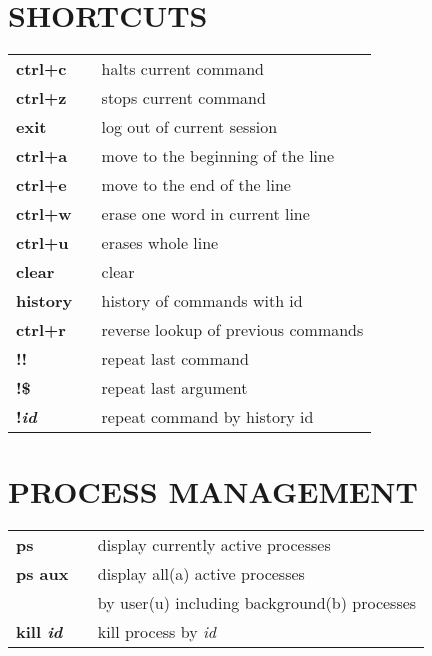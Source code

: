 \documentclass[10pt,landscape]{article}
\begin{document}
\begin{multicols}{2}
\section{SHORTCUTS}
\begin{tabular}{@{\hspace{1mm}}ll@{}}
{\bfseries ctrl+c} &~ halts current command \\
{\bfseries ctrl+z} &~ stops current command \\
{\bfseries exit} &~ log out of current session \\
{\bfseries ctrl+a} &~ move to the beginning of the line \\
{\bfseries ctrl+e} &~ move to the end of the line \\
{\bfseries ctrl+w} &~ erase one word in current line \\
{\bfseries ctrl+u} &~ erases whole line \\
{\bfseries clear} &~ clear \\
{\bfseries history} &~ history of commands with id \\
{\bfseries ctrl+r} &~ reverse lookup of previous commands \\
{\bfseries !!} &~ repeat last command \\
{\bfseries !\$} &~ repeat last argument \\
{\bfseries !{\em id}} &~ repeat command by history id \\
\end{tabular}

\section{PROCESS MANAGEMENT}
\begin{tabular}{@{\hspace{1mm}}ll@{}}
{\bfseries ps} &~ display currently active processes \\
{\bfseries ps aux} &~ display all(a) active processes \\ &~ by user(u) including background(b) processes  \\
{\bfseries kill {\em id}} &~ kill process by {\em id} \\
\end{tabular}


\end{multicols}
\end{document}
